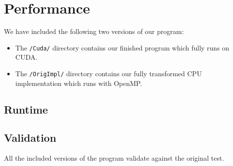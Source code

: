 \section{Performance}
We have included the following two versions of our program:
\begin{itemize}
\item The \verb!/Cuda/! directory contains our finished program which fully runs on CUDA.
\item The \verb!/OrigImpl/! directory contains our fully transformed CPU implementation which runs with OpenMP.
\end{itemize}
\subsection{Runtime}

\subsection{Validation} All the included versions of the program validate against the original test.

